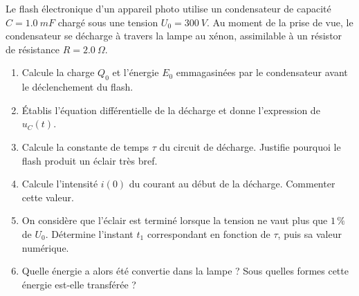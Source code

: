 \documentclass[11pt]{article}
\begin{document}
\begin{exercice}
Le flash électronique d'un appareil photo utilise un condensateur de capacité $C = \SI{1,0}{mF}$ chargé sous une tension $U_0 = \SI{300}{V}$. Au moment de la prise de vue, le condensateur se décharge à travers la lampe au xénon, assimilable à un résistor de résistance $R = \SI{2,0}{\Omega}$.
\begin{enumerate}
\item Calcule la charge $Q_0$ et l'énergie $E_0$ emmagasinées par le condensateur avant le déclenchement du flash.
\item Établis l'équation différentielle de la décharge et donne l'expression de $u_C(t)$.
\item Calcule la constante de temps $\tau$ du circuit de décharge. Justifie pourquoi le flash produit un éclair très bref.
\item Calcule l'intensité $i(0)$ du courant au début de la décharge. Commenter cette valeur.
\item On considère que l'éclair est terminé lorsque la tension ne vaut plus que $1\,\%$ de $U_0$. Détermine l'instant $t_1$ correspondant en fonction de $\tau$, puis sa valeur numérique.
\item Quelle énergie a alors été convertie dans la lampe ? Sous quelles formes cette énergie est-elle transférée ?
\end{enumerate}
\end{exercice}
\end{document}
